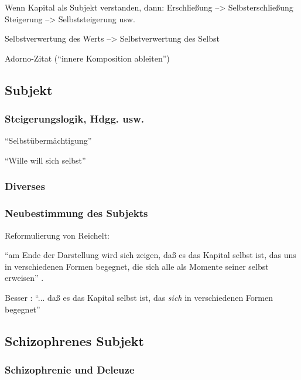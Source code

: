 \documentclass[12pt,
               DIV13,
               paper=a4,
               twoside=false,
               onehalfspacing,
               bibliography=totoc,
               toc=graduated,
               draft,
               ]{scrartcl}
\newcommand{\pc}[2]{\parencite[#1]{#2}}
\newcommand{\worries}[1]{\ifdraft{\textcolor{blue}{\texttt{(#1)}}}{}}
\begin{document}
Wenn Kapital als Subjekt verstanden, dann:
Erschließung --> Selbsterschließung
Steigerung --> Selbststeigerung usw.

Selbstverwertung des Werts --> Selbstverwertung des Selbst

Adorno-Zitat ("`innere Komposition ableiten"')


\subsection{Subjekt}

\subsubsection{Steigerungslogik, Hdgg. usw.}

"`Selbstübermächtigung"'

"`Wille will sich selbst"'

\subsubsection{Diverses}

\subsubsection{Neubestimmung des Subjekts}

Reformulierung von Reichelt:

"`am Ende der Darstellung wird sich zeigen, daß es das Kapital selbst
ist, das uns in verschiedenen Formen begegnet, die sich alle als
Momente seiner selbst erweisen"' \pc{181}{reichelt}.

Besser \worries{?}: "`... daß es das Kapital selbst ist, das
\emph{sich} in verschiedenen Formen begegnet"'



\subsection{Schizophrenes Subjekt}

\subsubsection{Schizophrenie und Deleuze}
\end{document}
